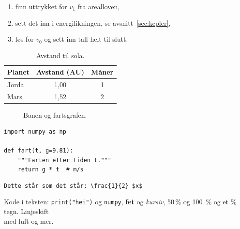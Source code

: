 \documentclass[a4paper,11pt]{article}
\begin{document}
\begin{enumerate}[label=\alph*)]
    \item finn uttrykket for $v_1$ fra arealloven,
    \item sett det inn i energilikningen, se avsnitt~\ref{sec:kepler},
    \item løs for $v_0$ og sett inn tall helt til slutt.
\end{enumerate}

\begin{table}[htbp]
    \centering
    \begin{tabular}{@{}l S[table-format=2.2] c@{}}
        \toprule
        Planet & {Avstand (\unit{AU})} & Måner \\
        \midrule
        Jorda & 1,00 & 1 \\
        Mars  & 1,52 & 2 \\
        \bottomrule
    \end{tabular}
    \caption{Avstand til sola.}\label{tab:planeter}
\end{table}

\begin{figure}[htbp]
    \centering
    \caption{Banen og fartsgrafen.}\label{fig:bane}
\end{figure}

\begin{verbatim}
import numpy as np

def fart(t, g=9.81):
    """Farten etter tiden t."""
    return g * t  # m/s
\end{verbatim}

\begin{verbatim}
Dette står som det står: \frac{1}{2} $x$
\end{verbatim}

Kode i teksten: \verb|print("hei")| og \texttt{numpy}, \textbf{fet} og \textit{kursiv}, 50\,\% og 100~\% og et \% tegn. Linjeskift\\[2pt]
med luft \hspace{1em} og \vspace{2mm} mer.




\end{document}

